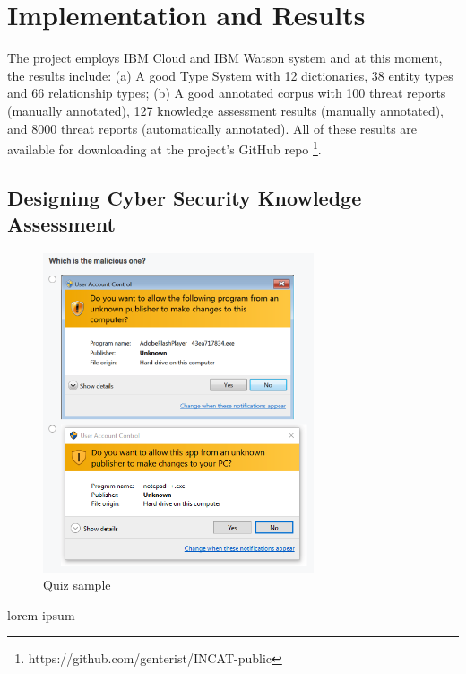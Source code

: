 \documentclass[conference]{IEEEtran}
\begin{document}
\section{Implementation and Results}
The project employs IBM Cloud and IBM Watson system and at this moment, the results include: (a) A good Type System with 12 dictionaries, 38 entity types and 66 relationship types; (b) A good annotated corpus with 100 threat reports (manually annotated), 127 knowledge assessment results (manually annotated), and 8000 threat reports (automatically annotated). All of these results are available for downloading at the project's GitHub repo \footnote{https://github.com/genterist/INCAT-public}.

\subsection{Designing Cyber Security Knowledge Assessment}

\begin{figure}[ht]
  \centering
  \includegraphics[width=8cm]{images/quiz-sample}
  \caption{Quiz sample}
  \label{Figure:quiz-sample}
\end{figure}

lorem ipsum
\end{document}
